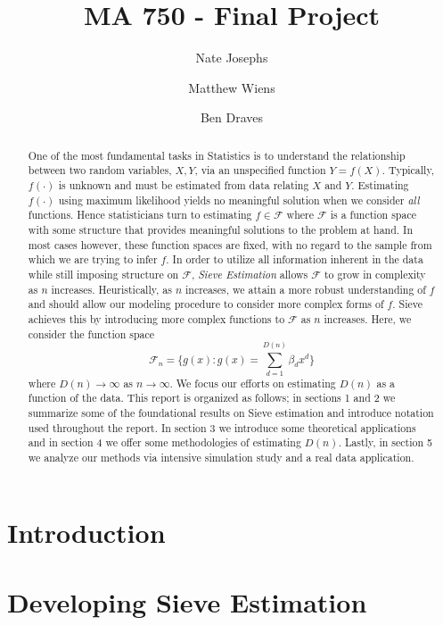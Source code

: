 \documentclass[12pt]{article}  %
\title{MA 750 - Final Project}
\author{
  Nate Josephs\\
  \and
  Matthew Wiens 
  \and 
  Ben Draves
}
\begin{document}
\maketitle 



\begin{abstract} One of the most fundamental tasks in Statistics is to understand the relationship between two random variables, $X,Y$, via an unspecified function $Y = f(X)$. Typically, $f(\cdot)$ is unknown and must be estimated from data relating $X$ and $Y$. Estimating $f(\cdot)$ using maximum likelihood yields no meaningful solution when we consider \textit{all} functions. Hence statisticians turn to estimating $f\in\mathcal{F}$ where $\mathcal{F}$ is a function space with some structure that provides meaningful solutions to the problem at hand. In most cases however, these function spaces are fixed, with no regard to the sample from which we are trying to infer $f$. In order to utilize all information inherent in the data while still imposing structure on $\mathcal{F}$, \textit{Sieve Estimation} allows $\mathcal{F}$ to grow in complexity as $n$ increases. Heuristically, as $n$ increases, we attain a more robust understanding of $f$ and should allow our modeling procedure to consider more complex forms of $f$. Sieve achieves this by introducing more complex functions to $\mathcal{F}$ as $n$ increases. Here, we consider the function space $$\mathcal{F}_n = \Big\{g(x): g(x) = \sum_{d=1}^{D(n)}\beta_dx^d\Big\}$$ where $D(n)\to\infty$ as $n\to\infty$. We focus our efforts on estimating $D(n)$ as a function of the data. This report is organized as follows; in sections 1 and 2 we summarize some of the foundational results on Sieve estimation and introduce notation used throughout the report. In section 3 we introduce some theoretical applications and in section 4 we offer some methodologies of estimating $D(n)$. Lastly, in section 5 we analyze our methods via intensive simulation study and a real data application.


\end{abstract}
  
\section{Introduction}
\section{Developing Sieve Estimation}
\end{document}
